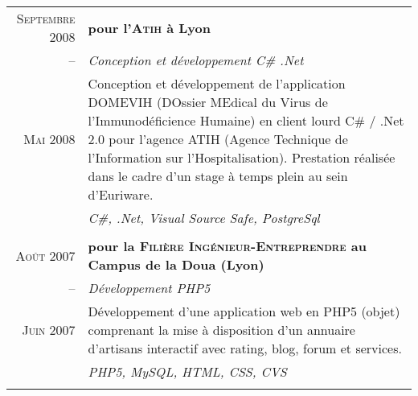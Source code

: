 \documentclass[a4paper,10pt]{article}
\begin{document}
\begin{supertabular}{r|p{11cm}}
  \textsc{Septembre 2008} & \textbf{pour l'\textsc{Atih} à Lyon}                                                         \\
  -- & \emph{Conception et développement C\# .Net}                                                                       \\
  \footnotesize{\textsc{Mai 2008}} & \footnotesize{Conception et développement de l’application DOMEVIH (DOssier MEdical du Virus de l’Immunodéficience Humaine) en client lourd C\# / .Net 2.0 pour l’agence ATIH (Agence Technique de l'Information sur l'Hospitalisation). Prestation réalisée dans le cadre d'un stage à temps plein au sein d'Euriware.} \\
  & \emph{C\#, .Net, Visual Source Safe, PostgreSql}                                                                     \\
                                                                                                     \\
  \textsc{Août 2007} & \textbf{pour la \textsc{Filière Ingénieur-Entreprendre} au Campus de la Doua (Lyon)}              \\
  -- & \emph{Développement PHP5}                                                                                         \\
  \footnotesize{\textsc{Juin 2007}} & \footnotesize{Développement d’une application web en PHP5 (objet) comprenant la mise à disposition d’un annuaire d’artisans interactif avec rating, blog, forum et services.} \\
  & \emph{PHP5, MySQL, HTML, CSS, CVS}                                                                                   \\
                                                                                                     \\
\end{supertabular}
\\
\end{document}
